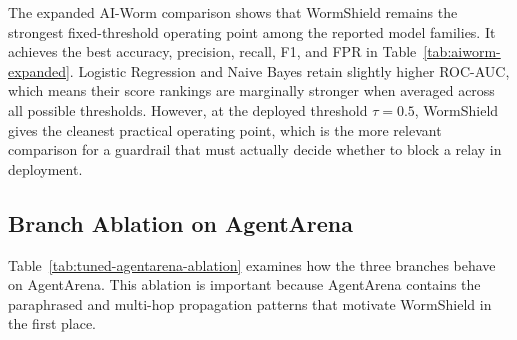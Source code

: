 The expanded AI-Worm comparison shows that WormShield remains the
strongest fixed-threshold operating point among the reported model
families. It achieves the best accuracy, precision, recall, F1, and
FPR in Table~\ref{tab:aiworm-expanded}. Logistic Regression and
Naive Bayes retain slightly higher ROC-AUC, which means their score
rankings are marginally stronger when averaged across all possible
thresholds. However, at the deployed threshold $\tau = 0.5$,
WormShield gives the cleanest practical operating point, which is the
more relevant comparison for a guardrail that must actually decide
whether to block a relay in deployment.

\subsection{Branch Ablation on AgentArena}

Table~\ref{tab:tuned-agentarena-ablation} examines how the three
branches behave on AgentArena. This ablation is important because
AgentArena contains the paraphrased and multi-hop propagation patterns
that motivate WormShield in the first place.

